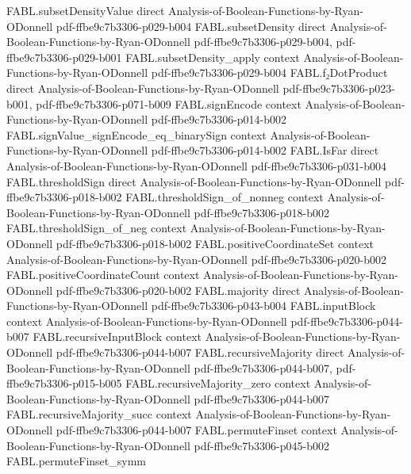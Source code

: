 \begin{theorem}
  {FABL.subsetDensityValue}
  {direct}
  {Analysis-of-Boolean-Functions-by-Ryan-ODonnell}
  {pdf-ffbe9c7b3306-p029-b004}
\proofstep
  {FABL.subsetDensity}
  {direct}
  {Analysis-of-Boolean-Functions-by-Ryan-ODonnell}
  {pdf-ffbe9c7b3306-p029-b004,
    pdf-ffbe9c7b3306-p029-b001}
\proofstep
  {FABL.subsetDensity_apply}
  {context}
  {Analysis-of-Boolean-Functions-by-Ryan-ODonnell}
  {pdf-ffbe9c7b3306-p029-b004}
\proofstep
  {FABL.f₂DotProduct}
  {direct}
  {Analysis-of-Boolean-Functions-by-Ryan-ODonnell}
  {pdf-ffbe9c7b3306-p023-b001,
    pdf-ffbe9c7b3306-p071-b009}
\proofstep
  {FABL.signEncode}
  {context}
  {Analysis-of-Boolean-Functions-by-Ryan-ODonnell}
  {pdf-ffbe9c7b3306-p014-b002}
\proofstep
  {FABL.signValue_signEncode_eq_binarySign}
  {context}
  {Analysis-of-Boolean-Functions-by-Ryan-ODonnell}
  {pdf-ffbe9c7b3306-p014-b002}
\proofstep
  {FABL.IsFar}
  {direct}
  {Analysis-of-Boolean-Functions-by-Ryan-ODonnell}
  {pdf-ffbe9c7b3306-p031-b004}
\proofstep
  {FABL.thresholdSign}
  {direct}
  {Analysis-of-Boolean-Functions-by-Ryan-ODonnell}
  {pdf-ffbe9c7b3306-p018-b002}
\proofstep
  {FABL.thresholdSign_of_nonneg}
  {context}
  {Analysis-of-Boolean-Functions-by-Ryan-ODonnell}
  {pdf-ffbe9c7b3306-p018-b002}
\proofstep
  {FABL.thresholdSign_of_neg}
  {context}
  {Analysis-of-Boolean-Functions-by-Ryan-ODonnell}
  {pdf-ffbe9c7b3306-p018-b002}
\proofstep
  {FABL.positiveCoordinateSet}
  {context}
  {Analysis-of-Boolean-Functions-by-Ryan-ODonnell}
  {pdf-ffbe9c7b3306-p020-b002}
\proofstep
  {FABL.positiveCoordinateCount}
  {context}
  {Analysis-of-Boolean-Functions-by-Ryan-ODonnell}
  {pdf-ffbe9c7b3306-p020-b002}
\proofstep
  {FABL.majority}
  {direct}
  {Analysis-of-Boolean-Functions-by-Ryan-ODonnell}
  {pdf-ffbe9c7b3306-p043-b004}
\proofstep
  {FABL.inputBlock}
  {context}
  {Analysis-of-Boolean-Functions-by-Ryan-ODonnell}
  {pdf-ffbe9c7b3306-p044-b007}
\proofstep
  {FABL.recursiveInputBlock}
  {context}
  {Analysis-of-Boolean-Functions-by-Ryan-ODonnell}
  {pdf-ffbe9c7b3306-p044-b007}
\proofstep
  {FABL.recursiveMajority}
  {direct}
  {Analysis-of-Boolean-Functions-by-Ryan-ODonnell}
  {pdf-ffbe9c7b3306-p044-b007,
    pdf-ffbe9c7b3306-p015-b005}
\proofstep
  {FABL.recursiveMajority_zero}
  {context}
  {Analysis-of-Boolean-Functions-by-Ryan-ODonnell}
  {pdf-ffbe9c7b3306-p044-b007}
\proofstep
  {FABL.recursiveMajority_succ}
  {context}
  {Analysis-of-Boolean-Functions-by-Ryan-ODonnell}
  {pdf-ffbe9c7b3306-p044-b007}
\proofstep
  {FABL.permuteFinset}
  {context}
  {Analysis-of-Boolean-Functions-by-Ryan-ODonnell}
  {pdf-ffbe9c7b3306-p045-b002}
\proofstep
  {FABL.permuteFinset_symm}

\end{theorem}
